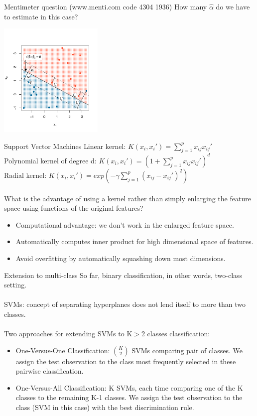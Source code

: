 \documentclass[notes]{beamer}          %
\begin{document}
\begin{frame}{Mentimeter question (www.menti.com code 4304 1936)}
How many $\hat \alpha$ do we have to estimate in this case?
\begin{center}
\includegraphics[height=5.5cm]{../figures/week_2_classification/svm_support_vector_classifier.pdf}  
\end{center}
\end{frame}

\begin{frame}{Support Vector Machines}
Linear kernel: $\mathit{K}(x_i,x_i') = \sum_{j=1}^{p} x_{ij} x_{ij}' $ \\
Polynomial kernel of degree d: $\mathit{K}(x_i,x_i') = (1+ \sum_{j=1}^{p} x_{ij} x_{ij}')^d$\\
Radial kernel: $\mathit{K}(x_i,x_i') = exp(- \gamma \sum_{j=1}^{p} (x_{ij}-x_{ij}')^2)$ \\~\\
What is the advantage of using a kernel rather than simply enlarging the feature space using functions of the original features?
\begin{itemize}
 \item Computational advantage: we don't work in the enlarged feature space.
  \item Automatically computes inner product for high dimensional space of features.
  \item Avoid overfitting by automatically squashing down most dimensions.
\end{itemize}
\end{frame}

\begin{frame}{Extension to multi-class}
So far, binary classification, in other words, two-class setting. \\~\\
SVMs: concept of separating hyperplanes does not lend itself to more than two classes. \\~\\
Two approaches for extending SVMs to K$>$2 classes classification:
\begin{itemize}
 \item One-Versus-One Classification: $\binom{K}{2}$ SVMs comparing pair of classes. We assign the test observation to the class most frequently selected in these pairwise classification.
 \item One-Versus-All Classification: K SVMs, each time comparing one of the K classes to the remaining K-1 classes. We assign the test observation to the class (SVM in this case) with the best discrimination rule. 
\end{itemize}
\end{frame}
\end{document}
